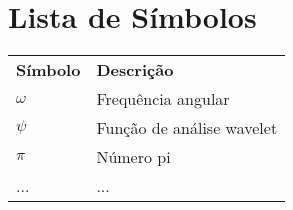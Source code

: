 \chapter*{Lista de Símbolos} 

\begin{longtable}[l]{l l} 
   \textbf{Símbolo}	& \textbf{Descrição} \\
   
   $\omega$ & Frequência angular \\
   $\psi$ & Função de análise wavelet \\ 
   $\pi$ &  Número pi\\
   ... & ... \\ 
\end{longtable}
